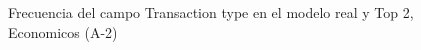 \begin{figure}[H]
    \centering
    
    \caption{Frecuencia del campo Transaction type en el modelo real y Top 2, Economicos (A-2)}
    \label{frecuency-Transaction Type-top2}
\end{figure}